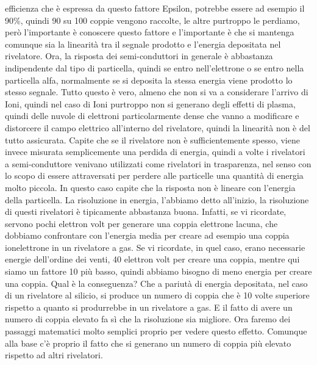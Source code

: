 efficienza che è espressa da questo fattore Epsilon, potrebbe essere ad esempio il 90\%, quindi 90 su 100 coppie vengono raccolte, le altre purtroppo le perdiamo, però l'importante è conoscere questo fattore e l'importante è che si mantenga comunque sia la linearità tra il segnale prodotto e l'energia depositata nel rivelatore. Ora, la risposta dei semi-conduttori in generale è abbastanza indipendente dal tipo di particella, quindi se entro nell'elettrone o se entro nella particella alfa, normalmente se si deposita la stessa energia viene prodotto lo stesso segnale. Tutto questo è vero, almeno che non si va a considerare l'arrivo di Ioni, quindi nel caso di Ioni purtroppo non si generano degli effetti di plasma, quindi delle nuvole di elettroni particolarmente dense che vanno a modificare e distorcere il campo elettrico all'interno del rivelatore, quindi la linearità non è del tutto assicurata. Capite che se il rivelatore non è sufficientemente spesso, viene invece misurata semplicemente una perdida di energia, quindi a volte i rivelatori a semi-conduttore venivano utilizzati come rivelatori in trasparenza, nel senso con lo scopo di essere attraversati per perdere alle particelle una quantità di energia molto piccola. In questo caso capite che la risposta non è lineare con l'energia della particella. La risoluzione in energia, l'abbiamo detto all'inizio, la risoluzione di questi rivelatori è tipicamente abbastanza buona. Infatti, se vi ricordate, servono pochi elettron volt per generare una coppia elettrone lacuna, che dobbiamo confrontare con l'energia media per creare ad esempio una coppia ionelettrone in un rivelatore a gas. Se vi ricordate, in quel caso, erano necessarie energie dell'ordine dei venti, 40 elettron volt per creare una coppia, mentre qui siamo un fattore 10 più basso, quindi abbiamo bisogno di meno energia per creare una coppia. Qual è la conseguenza? Che a pariutà di energia depositata, nel caso di un rivelatore al silicio, si produce un numero di coppia che è 10 volte superiore rispetto a quanto si produrrebbe in un rivelatore a gas. E il fatto di avere un numero di coppia elevato fa sì che la risoluzione sia migliore. Ora faremo dei passaggi matematici molto semplici proprio per vedere questo effetto. Comunque alla base c'è proprio il fatto che si generano un numero di coppia più elevato rispetto ad altri rivelatori.

